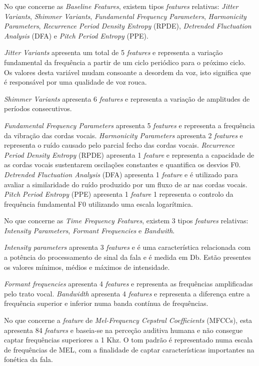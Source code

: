 \documentclass[12pt,a4paper,twoside]{report}
\begin{document}
{No que concerne as \textit{Baseline Features}, existem tipos \textit{features} relativas: \textit{Jitter Variants}, \textit{Shimmer Variants}, \textit{Fundamental Frequency Parameters}, \textit{Harmonicity Parameters}, \textit{Recurrence Period Density Entropy} (RPDE), \textit{Detrended Fluctuation Analysis} (DFA) e \textit{Pitch Period Entropy} (PPE).

\textit{Jitter Variants} apresenta um total de 5 \textit{features} e representa a variação fundamental da frequência a partir de um ciclo periódico para o próximo ciclo. Os valores desta variável mudam consoante a desordem da voz, isto significa que é responsável por uma qualidade de voz rouca.

\textit{Shimmer Variants} apresenta 6 \textit{features} e representa a variação de amplitudes de períodos consecutivos.

\textit{Fundamental Frequency Parameters} apresenta 5 \textit{features} e representa a frequência da vibração das cordas vocais.
\textit{Harmonicity Parameters} apresenta 2 \textit{features} e representa o ruído causado pelo parcial fecho das cordas vocais.
\textit{Recurrence Period Density Entropy} (RPDE) apresenta 1 \textit{feature} e representa a capacidade de as cordas vocais sustentarem oscilações constantes e quantifica os desvios F0.
\textit{Detrended Fluctuation Analysis} (DFA) apresenta 1 \textit{feature} e é utilizado para avaliar a similaridade do ruído produzido por um fluxo de ar nas cordas vocais.
\textit{Pitch Period Entropy} (PPE) apresenta 1 \textit{feature} 1 representa o controlo da frequência fundamental F0 utilizando uma escala logarítmica.

No que concerne as \textit{Time Frequency Features}, existem 3 tipos \textit{features} relativas: \textit{Intensity Parameters}, \textit{Formant Frequencies} e \textit{Bandwith}.

\textit{Intensity parameters} apresenta 3 \textit{features} e é uma característica relacionada com a potência do processamento de sinal da fala e é medida em Db. Estão presentes os valores mínimos, médios e máximos de intensidade.

\textit{Formant frequencies} apresenta 4 \textit{features} e representa as frequências amplificadas pelo trato vocal.
\textit{Bandwidth} apresenta 4 \textit{features} e representa a diferença entre a frequência superior e inferior numa banda contínua de frequências.

No que concerne a \textit{feature} de \textit{Mel-Frequency Cepstral Coefficients} (MFCCs), esta apresenta 84 \textit{features} e baseia-se na perceção auditiva humana e não consegue captar frequências superiores a 1 Khz.
O tom padrão é representado numa escala de frequências de MEL, com a finalidade de captar características importantes na fonética da fala.

}
\end{document}
